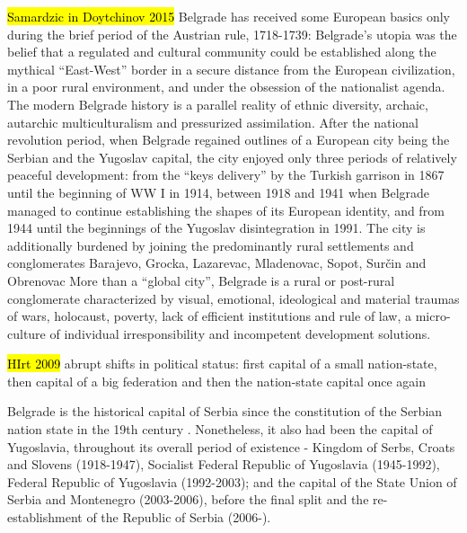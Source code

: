 \documentclass[11pt]{report}
\begin{document}
\hl{Samardzic in Doytchinov 2015} 
Belgrade has received some European basics only during the
brief period of the Austrian rule, 1718-1739:
Belgrade’s utopia was the belief that a regulated and cultural community could be  established  along  the  mythical  “East-West”  border  in  a  secure  distance from  the  European  civilization,  in  a  poor  rural  environment,  and  under  the obsession of the nationalist agenda.
The modern Belgrade history is a parallel reality of ethnic diversity, archaic, autarchic multiculturalism  and  pressurized  assimilation.
After the national revolution period, when Belgrade regained outlines of a European city being the Serbian and the Yugoslav capital, the city enjoyed only three periods  of  relatively  peaceful  development:  from the “keys delivery” by the Turkish garrison in 1867 until the beginning of WW I in 1914, between 1918 and  1941  when  Belgrade  managed  to  continue establishing  the  shapes  of  its  European  identity,  and  from  1944  until  the beginnings of the Yugoslav disintegration in 1991.
The  city  is additionally burdened by joining the predominantly rural  settlements  and  conglomerates  Barajevo, Grocka,  Lazarevac,  Mladenovac,  Sopot,  Surčin  and Obrenovac
More  than  a  “global  city”,  Belgrade  is  a  rural  or  post-rural  conglomerate characterized by visual, emotional, ideological and material traumas of wars, holocaust, poverty, lack of efficient institutions and rule of law, a micro-culture of  individual  irresponsibility  and  incompetent  development  solutions.

\hl{HIrt 2009}
abrupt shifts in political status: first capital of a small nation-state, then capital of a big federation and then the nation-state capital once again

Belgrade is the historical capital of Serbia since the constitution of the Serbian nation state in the 19th century . Nonetheless, it also had been the capital of Yugoslavia, throughout its overall period of existence - Kingdom of Serbs, Croats and Slovens (1918-1947), Socialist Federal Republic of Yugoslavia (1945-1992), Federal Republic of Yugoslavia (1992-2003); and the capital of the State Union of Serbia and Montenegro (2003-2006), before the final split and the re-establishment of the Republic of Serbia (2006-).
\end{document}
